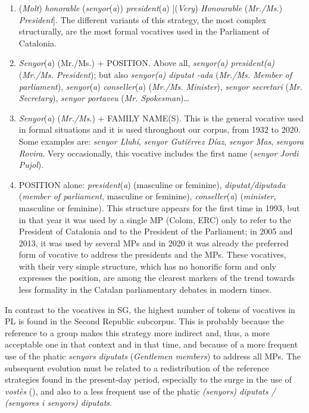 \documentclass[output=paper]{langscibook}
\begin{document}
\begin{enumerate}

\item (\textit{Molt}) \textit{honorable} (\textit{senyor}(\textit{a})) \textit{president}(\textit{a}) [(\textit{Very}) \textit{Honourable} (\textit{Mr./Ms.}) \textit{President}]. The different variants of this strategy, the most complex structurally, are the most formal vocatives used in the Parliament of Catalonia.



\item \textit{Senyor}(\textit{a}) (Mr./Ms.) + POSITION. Above all, \textit{senyor(a) president(a)} (\textit{Mr./Ms. President}); but also \textit{senyor(a) diputat -ada} (\textit{Mr./Ms. Member of parliament}), \textit{senyor}(\textit{a}) \textit{conseller}(\textit{a}) (\textit{Mr./Ms. Minister}), \textit{senyor secretari} (\textit{Mr. Secretary}), \textit{senyor portaveu} (\textit{Mr. Spokesman})…



\item \textit{Senyor}(\textit{a}) (\textit{Mr./Ms.}) + FAMILY NAME(S). This is the general vocative used in formal situations and it is used throughout our corpus, from 1932 to 2020. Some examples are: \textit{senyor Lluhí}, \textit{senyor Gutiérrez Díaz}, \textit{senyor Mas}, \textit{senyora Rovira}. Very occasionally, this vocative includes the first name (\textit{senyor Jordi Pujol}).



\item POSITION alone: \textit{president}(\textit{a}) (masculine or feminine), \textit{diputat/diputada} (\textit{member of parliament}, masculine or feminine), \textit{conseller}(\textit{a}) (\textit{minister}, masculine or feminine). This structure appears for the first time in 1993, but in that year it was used by a single MP (Colom, ERC) only to refer to the President of Catalonia and to the President of the Parliament; in 2005 and 2013, it was used by several MPs and in 2020 it was already the preferred form of vocative to address the presidents and the MPs. These vocatives, with their very simple structure, which has no honorific form and only expresses the position, are among the clearest markers of the trend towards less formality in the Catalan parliamentary debates in modern times.
\end{enumerate}


In contrast to the vocatives in SG, the highest number of tokens of vocatives in PL is found in the Second Republic subcorpus. This is probably because the reference to a group makes this strategy more indirect and, thus, a more acceptable one in that context and in that time, and because of a more frequent use of the phatic \textit{senyors diputats} (\textit{Gentlemen members}) to address all MPs. The subsequent evolution must be related to a redistribution of the reference strategies found in the present-day period, especially to the surge in the use of \textit{vostès} (), and also to a less frequent use of the phatic \textit{(senyors) diputats / (senyores i senyors) diputats}.
\end{document}
